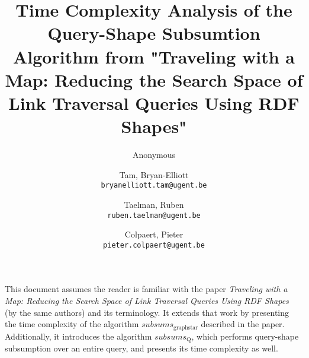 \documentclass{article}
\title{Time Complexity Analysis of the Query-Shape Subsumtion Algorithm from "Traveling with a Map: Reducing the Search Space of Link Traversal Queries Using RDF Shapes"}
\author{Anonymous}
\author{Tam, Bryan-Elliott \\
        \texttt{bryanelliott.tam@ugent.be}
        \and 
        Taelman, Ruben \\
        \texttt{ruben.taelman@ugent.be}
        \and
        Colpaert, Pieter \\
        \texttt{pieter.colpaert@ugent.be}
    }
\begin{document}
\maketitle

This document assumes the reader is familiar with the paper \textit{Traveling with a Map: Reducing the Search Space of Link Traversal Queries Using RDF Shapes} (by the same authors) and its terminology.
It extends that work by presenting the time complexity of the algorithm $subsums_{\mathrm{graph star}}$ described in the paper.
Additionally, it introduces the algorithm $subsums_{\mathrm{Q}}$, which performs query-shape subsumption over an entire query, and presents its time complexity as well.


\end{document}
